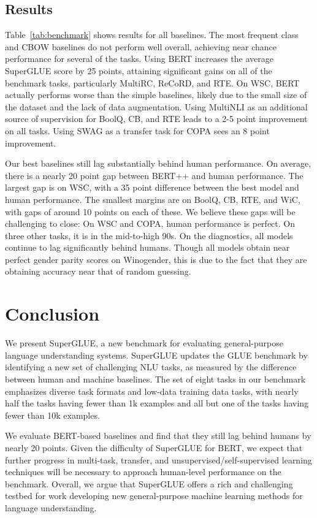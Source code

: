 \subsection{Results}

Table~\ref{tab:benchmark} shows results for all baselines. 
The most frequent class and CBOW baselines do not perform well overall, achieving near chance performance for several of the tasks.
Using BERT increases the average SuperGLUE score by 25 points,
attaining significant gains on all of the benchmark tasks, particularly MultiRC, ReCoRD, and RTE. On WSC, BERT actually performs worse than the simple baselines, likely due to the small size of the dataset and the lack of data augmentation.
Using MultiNLI as an additional source of supervision for BoolQ, CB, and RTE leads to a 2-5 point improvement on all tasks.
Using SWAG as a transfer task for COPA sees an 8 point improvement.

Our best baselines still lag substantially behind human performance.
On average, there is a nearly 20 point gap between \textsc{BERT++} and human performance. The largest gap is on WSC, with a 35 point difference between the best model and human performance. 
The smallest margins are on BoolQ, CB, RTE, and WiC, with gaps of around 10 points on each of these.
We believe these gaps will be challenging to close: On WSC and COPA, human performance is perfect. On three other tasks, it is in the mid-to-high 90s. 
On the diagnostics, all models continue to lag significantly behind humans.
Though all models obtain near perfect gender parity scores on Winogender, this is due to the fact that they are obtaining accuracy near that of random guessing.

\section{Conclusion}

We present SuperGLUE, a new benchmark for evaluating general-purpose language understanding systems.
SuperGLUE updates the GLUE benchmark by identifying a new set of challenging NLU tasks, as measured by the difference between human and machine baselines.
The set of eight tasks in our benchmark emphasizes diverse task formats and low-data training data tasks, with nearly half the tasks having fewer than 1k examples and all but one of the tasks having fewer than 10k examples.

We evaluate BERT-based baselines and find that they still lag behind humans by nearly 20 points.
Given the difficulty of SuperGLUE for BERT, we expect that further progress in multi-task, transfer, and unsupervised/self-supervised learning techniques will be necessary to approach human-level performance on the benchmark.
Overall, we argue that SuperGLUE offers a rich and challenging testbed for work developing new general-purpose machine learning methods for language understanding.

